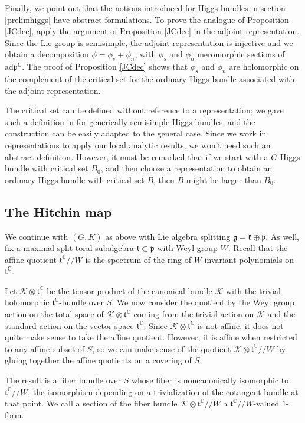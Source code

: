 \documentclass[10pt]{amsart}
\newcommand{\p}{\mathfrak{p}}
\newcommand{\g}{\mathfrak{g}}
\newcommand{\kk}{\mathfrak{k}}
\newcommand{\ft}{\mathfrak{t}}
\theoremstyle{definition}
\DeclareMathOperator{\C}{\mathbb{C}}
\begin{document}
Finally, we point out that the notions introduced for Higgs bundles in section \ref{prelimhiggs} have abstract formulations. 
To prove the analogue of Proposition \ref{JCdec}, apply the argument of Proposition \ref{JCdec} in the adjoint representation. Since the Lie group is semisimple, the adjoint representation is injective and we obtain a decomposition $\phi=\phi_s+\phi_n$, with $\phi_s$ and $\phi_n$ meromorphic sections of $\textrm{ad}\p^{\C}$. The proof of Proposition \ref{JCdec} shows that $\phi_s$ and $\phi_n$ are holomorphic on the complement of the critical set for the ordinary Higgs bundle associated with the adjoint representation.

The critical set can be defined without reference to a representation; we gave such a definition in \cite[section 3.4]{SS} for generically semisimple Higgs bundles, and the construction can be easily adapted to the general case. Since we work in representations to apply our local analytic results, we won't need such an abstract definition. However, it must be remarked that if we start with a $G$-Higgs bundle with critical set $B_0$, and then choose a representation to obtain an ordinary Higgs bundle with critical set $B$, then $B$ might be larger than $B_0$. 

\subsection{The Hitchin map}\label{HBsection}
We continue with $(G,K)$ as above with Lie algebra splitting $\g=\kk\oplus \p$. As well, fix  a maximal split toral subalgebra $\ft\subset \p$ with Weyl group $W$. Recall that the affine quotient $\ft^{\C}//W$ is the spectrum of the ring of $W$-invariant polynomials on $\ft^{\C}$.  

Let $\mathcal{K} \otimes \ft^{\C}$ be the tensor product of the canonical bundle $\mathcal{K}$ with the trivial holomorphic $\ft^{\C}$-bundle over $S$. We now consider the quotient by the Weyl group action on the total space of $\mathcal{K}\otimes\ft^{\C}$ coming from the trivial action on $\mathcal{K}$ and the standard action on the vector space $\ft^{\C}$. Since $\mathcal{K}\otimes\ft^{\C}$ is not affine, it does not quite make sense to take the affine quotient. However, it is affine when restricted to any affine subset of $S$, so we can make sense of the quotient $\mathcal{K}\otimes \ft^{\C}//W$ by gluing together the affine quotients on a covering of $S$.

The result is a fiber bundle over $S$ whose fiber is noncanonically isomorphic to $\ft^{\C}//W$, the isomorphism depending on a trivialization of the cotangent bundle at that point. We call a section of the fiber bundle $\mathcal{K}\otimes \ft^{\C}//W$ a $\ft^{\C}//W$-valued $1$-form.
\end{document}
